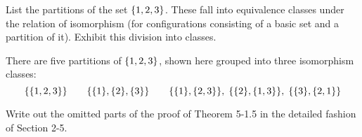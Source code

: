 \begin{exercise}
List the partitions of the set $\left\{1, 2,3\right\}$. These fall into equivalence classes under the
relation of isomorphism (for configurations consisting of a basic set and a partition of it).
Exhibit this division into classes.
\end{exercise}

\begin{solution}
There are five partitions of $\left\{1,2,3\right\}$, shown here grouped into three isomorphism classes:
\[
\set{\set{1,2,3}}\qquad
\set{\set{1},\set{2},\set{3}}\qquad
\set{\set{1},\set{2,3}},\thickspace\set{\set{2},\set{1,3}},\thickspace\set{\set{3},\set{2,1}}
\]
\end{solution}

\begin{exercise}
Write out the omitted parts of the proof of Theorem 5-1.5 in the detailed fashion
of Section 2-5.
\end{exercise}

